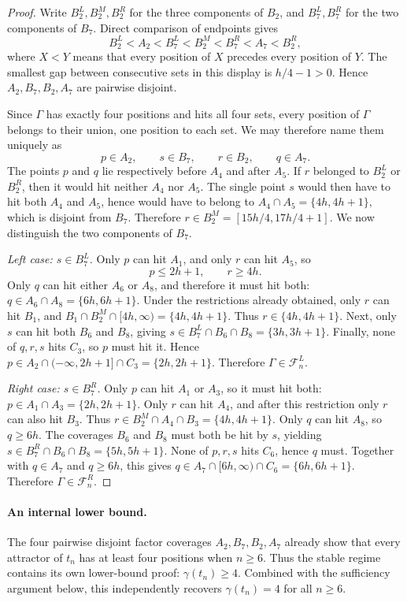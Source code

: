 \documentclass[10pt,a4paper]{article}
\theoremstyle{definition}\newtheorem{definition}[theorem]{Definition}
\theoremstyle{remark}\newtheorem{remark}[theorem]{Remark}
\newcommand{\FL}{\mathcal{F}^{L}}
\newcommand{\FR}{\mathcal{F}^{R}}
\begin{document}
\begin{proof}
Write $B_2^L,B_2^M,B_2^R$ for the three components of $B_2$, and $B_7^L,B_7^R$ for the two components of $B_7$.  Direct comparison of endpoints gives
\[
 B_2^L<A_2<B_7^L<B_2^M<B_7^R<A_7<B_2^R,
\]
where $X<Y$ means that every position of $X$ precedes every position of $Y$.  The smallest gap between consecutive sets in this display is $h/4-1>0$.  Hence $A_2,B_7,B_2,A_7$ are pairwise disjoint.

Since $\Gamma$ has exactly four positions and hits all four sets, every position of $\Gamma$ belongs to their union, one position to each set.  We may therefore name them uniquely as
\[
 p\in A_2,\qquad s\in B_7,\qquad r\in B_2,\qquad q\in A_7.
\]
The points $p$ and $q$ lie respectively before $A_4$ and after $A_5$.  If $r$ belonged to $B_2^L$ or $B_2^R$, then it would hit neither $A_4$ nor $A_5$.  The single point $s$ would then have to hit both $A_4$ and $A_5$, hence would have to belong to
$
 A_4\cap A_5=\{4h,4h+1\},
$
which is disjoint from $B_7$.  Therefore
$
 r\in B_2^M=[15h/4,17h/4+1].
$
We now distinguish the two components of $B_7$.

\smallskip
\noindent\emph{Left case: $s\in B_7^L$.}
Only $p$ can hit $A_1$, and only $r$ can hit $A_5$, so
\[
 p\le2h+1,\qquad r\ge4h.
\]
Only $q$ can hit either $A_6$ or $A_8$, and therefore it must hit both:
$
 q\in A_6\cap A_8=\{6h,6h+1\}.
$
Under the restrictions already obtained, only $r$ can hit $B_1$, and
$
 B_1\cap B_2^M\cap[4h,\infty)=\{4h,4h+1\}.
$
Thus $r\in\{4h,4h+1\}$.  Next, only $s$ can hit both $B_6$ and $B_8$, giving
$
 s\in B_7^L\cap B_6\cap B_8=\{3h,3h+1\}.
$
Finally, none of $q,r,s$ hits $C_3$, so $p$ must hit it.  Hence
$
 p\in A_2\cap(-\infty,2h+1]\cap C_3=\{2h,2h+1\}.
$
Therefore $\Gamma\in\FL_n$.

\smallskip
\noindent\emph{Right case: $s\in B_7^R$.}
Only $p$ can hit $A_1$ or $A_3$, so it must hit both:
$
 p\in A_1\cap A_3=\{2h,2h+1\}.
$
Only $r$ can hit $A_4$, and after this restriction only $r$ can also hit $B_3$.  Thus
$
 r\in B_2^M\cap A_4\cap B_3=\{4h,4h+1\}.
$
Only $q$ can hit $A_8$, so $q\ge6h$.  The coverages $B_6$ and $B_8$ must both be hit by $s$, yielding
$
 s\in B_7^R\cap B_6\cap B_8=\{5h,5h+1\}.
$
None of $p,r,s$ hits $C_6$, hence $q$ must.  Together with $q\in A_7$ and $q\ge6h$, this gives
$
 q\in A_7\cap[6h,\infty)\cap C_6=\{6h,6h+1\}.
$
Therefore $\Gamma\in\FR_n$.
\end{proof}

\paragraph{An internal lower bound.}
The four pairwise disjoint factor coverages $A_2,B_7,B_2,A_7$ already show that every attractor of $t_n$ has at least four positions when $n\ge6$.  Thus the stable regime contains its own lower-bound proof:
$
 \gamma(t_n)\ge4.
$
Combined with the sufficiency argument below, this independently recovers $\gamma(t_n)=4$ for all $n\ge6$.
\end{document}
